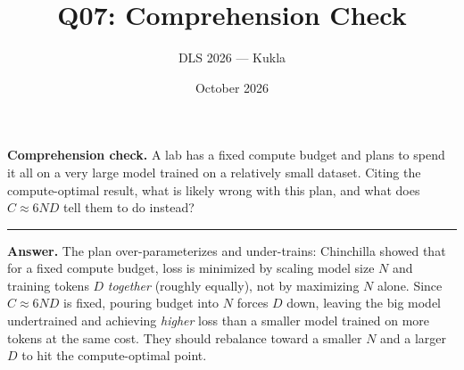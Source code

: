 \documentclass[11pt]{article}
\title{Q07: Comprehension Check}
\author{DLS 2026 --- Kukla}
\date{October 2026}
\begin{document}
\maketitle
\textbf{Comprehension check.} A lab has a fixed compute budget and plans to spend it all on a very large
model trained on a relatively small dataset. Citing the compute-optimal result, what is likely wrong with
this plan, and what does $C \approx 6ND$ tell them to do instead?

\vspace{0.8cm}\hrule\vspace{4pt}
{\small\textbf{Answer.} The plan over-parameterizes and under-trains: Chinchilla showed that for a fixed
compute budget, loss is minimized by scaling model size $N$ and training tokens $D$ \emph{together}
(roughly equally), not by maximizing $N$ alone. Since $C \approx 6ND$ is fixed, pouring budget into $N$
forces $D$ down, leaving the big model undertrained and achieving \emph{higher} loss than a smaller model
trained on more tokens at the same cost. They should rebalance toward a smaller $N$ and a larger $D$ to
hit the compute-optimal point.}
\end{document}
